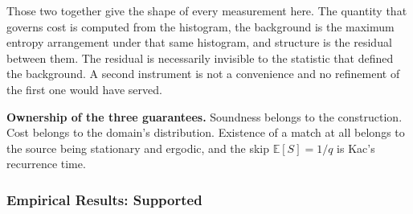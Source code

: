 Those two together give the shape of every measurement here. The quantity that governs cost is computed from the histogram, the background is the maximum entropy arrangement under that same histogram, and structure is the residual between them. The residual is necessarily invisible to the statistic that defined the background. A second instrument is not a convenience and no refinement of the first one would have served.

\textbf{Ownership of the three guarantees.} Soundness belongs to the construction. Cost belongs to the domain's distribution. Existence of a match at all belongs to the source being stationary and ergodic, and the skip \(\mathbb{E}[S] = 1/q\) is Kac's recurrence time.

\subsubsection{Empirical Results: Supported}

